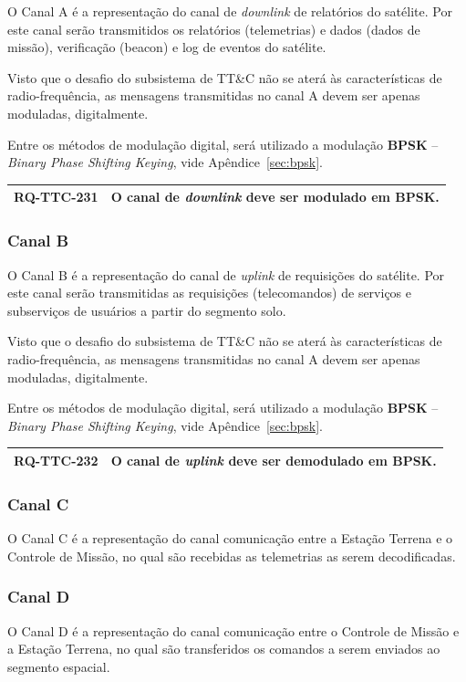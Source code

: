 O Canal A é a representação do canal de \textit{downlink} de relatórios do satélite.
Por este canal serão transmitidos os relatórios (telemetrias) e dados (dados de missão), verificação (beacon) e log de eventos do satélite.

Visto que o desafio do subsistema de TT\&C não se aterá às características de radio-frequência, as mensagens transmitidas no canal A devem ser apenas moduladas, digitalmente.

Entre os métodos de modulação digital, será utilizado a modulação \textbf{BPSK} -- \textit{Binary Phase Shifting Keying}, vide Apêndice~\ref{sec:bpsk}.

\begin{table}[H]
    \centering
    \begin{tabular}{|c|c|}
        \hline
        \rowcolor{orange}
        \textbf{RQ-TTC-231} & \textbf{O canal de \textit{downlink} deve ser modulado em BPSK.} \\ \hline
    \end{tabular}
    \label{tab:rq-ttc-011}
\end{table}

\subsubsection{Canal B}

O Canal B é a representação do canal de \textit{uplink} de requisições do satélite.
Por este canal serão transmitidas as requisições (telecomandos) de serviços e subserviços de usuários a partir do segmento solo.

Visto que o desafio do subsistema de TT\&C não se aterá às características de radio-frequência, as mensagens transmitidas no canal A devem ser apenas moduladas, digitalmente.

Entre os métodos de modulação digital, será utilizado a modulação \textbf{BPSK} -- \textit{Binary Phase Shifting Keying}, vide Apêndice~\ref{sec:bpsk}.

\begin{table}[H]
    \centering
    \begin{tabular}{|c|c|}
        \hline
        \rowcolor{orange}
        \textbf{RQ-TTC-232} & \textbf{O canal de \textit{uplink} deve ser demodulado em BPSK.} \\ \hline
    \end{tabular}
    \label{tab:rq-ttc-021}
\end{table}

\subsubsection{Canal C}

O Canal C é a representação do canal comunicação entre a Estação Terrena e o Controle de Missão, no qual são recebidas as telemetrias as serem decodificadas.

\subsubsection{Canal D}

O Canal D é a representação do canal comunicação entre o Controle de Missão e a Estação Terrena, no qual são transferidos os comandos a serem enviados ao segmento espacial.
